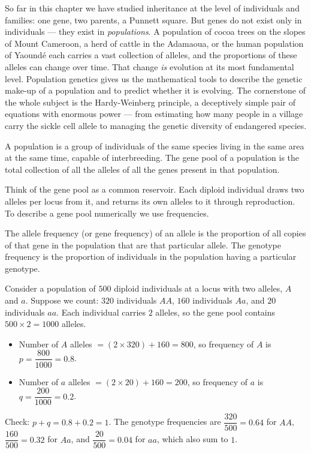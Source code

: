 \documentclass[11pt]{article}
\newcommand{\cle}[1]{{\popxbold\color{popdark}#1}}
\newcounter{popsec}
\newcounter{popsub}
\newcommand{\courssub}[1]{%
  \stepcounter{popsub}%
  \par\vspace{9pt}\noindent{\popxbold\fontsize{11.5}{13}\selectfont\color{popink}{\color{poporange}\thepopsec.\thepopsub}\hspace{6pt}#1}\par\nopagebreak\vspace{4pt}
}
\begin{document}
So far in this chapter we have studied inheritance at the level of individuals and families: one gene, two parents, a Punnett square. But genes do not exist only in individuals --- they exist in \emph{populations}. A population of cocoa trees on the slopes of Mount Cameroon, a herd of cattle in the Adamaoua, or the human population of Yaound\'e each carries a vast collection of alleles, and the proportions of these alleles can change over time. That change \emph{is} evolution at its most fundamental level. Population genetics gives us the mathematical tools to describe the genetic make-up of a population and to predict whether it is evolving. The cornerstone of the whole subject is the \cle{Hardy-Weinberg principle}, a deceptively simple pair of equations with enormous power --- from estimating how many people in a village carry the sickle cell allele to managing the genetic diversity of endangered species.

\courssub{Populations, Gene Pools and Frequencies}

\begin{definition}
A \cle{population} is a group of individuals of the same species living in the same area at the same time, capable of interbreeding. The \cle{gene pool} of a population is the total collection of all the alleles of all the genes present in that population.
\end{definition}

Think of the gene pool as a common reservoir. Each diploid individual draws two alleles per locus from it, and returns its own alleles to it through reproduction. To describe a gene pool numerically we use frequencies.

\begin{definition}
The \cle{allele frequency} (or gene frequency) of an allele is the proportion of all copies of that gene in the population that are that particular allele. The \cle{genotype frequency} is the proportion of individuals in the population having a particular genotype.
\end{definition}

\begin{exemplebox}
Consider a population of $500$ diploid individuals at a locus with two alleles, $A$ and $a$. Suppose we count: $320$ individuals $AA$, $160$ individuals $Aa$, and $20$ individuals $aa$. Each individual carries $2$ alleles, so the gene pool contains $500 \times 2 = 1000$ alleles.
\begin{itemize}
\item Number of $A$ alleles $= (2 \times 320) + 160 = 800$, so frequency of $A$ is $p = \dfrac{800}{1000} = 0.8$.
\item Number of $a$ alleles $= (2 \times 20) + 160 = 200$, so frequency of $a$ is $q = \dfrac{200}{1000} = 0.2$.
\end{itemize}
Check: $p + q = 0.8 + 0.2 = 1$. The genotype frequencies are $\dfrac{320}{500} = 0.64$ for $AA$, $\dfrac{160}{500} = 0.32$ for $Aa$, and $\dfrac{20}{500} = 0.04$ for $aa$, which also sum to $1$.
\end{exemplebox}
\end{document}

